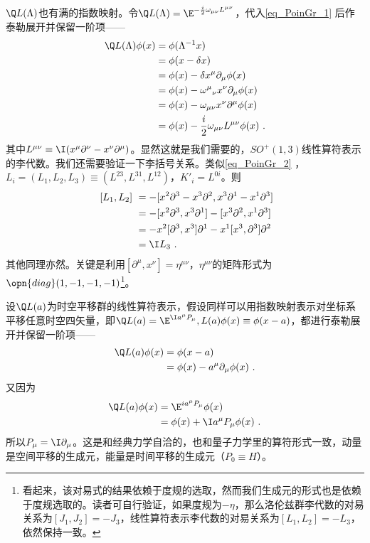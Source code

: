 $\Q L(\Lambda)$也有满的指数映射。令$\Q L(\Lambda)=\E^{-\frac{i}{2} \omega_{\mu \nu} L^{\mu \nu}}$，代入\autoref{eq_PoinGr_1} 后作泰勒展开并保留一阶项——
\begin{equation}
\begin{aligned}
\Q L(\Lambda)\phi(x)&=\phi(\Lambda^{-1}x)\\
&=\phi(x-\delta x)\\
&= \phi(x)-\delta x^{\mu} \partial_{\mu} \phi(x) \\
&= \phi(x)-\omega^{\mu}{ }_{\nu} x^{\nu} \partial_{\mu} \phi(x) \\
&=\phi(x)-\omega_{\mu \nu} x^{\nu} \partial^{\mu} \phi(x) \\
&= \phi(x)-\frac{i}{2} \omega_{\mu \nu} L^{\mu \nu} \phi(x)~.
\end{aligned}
\end{equation}
其中$L^{\mu\nu}\equiv\I(x^{\mu}\partial^{\nu}-x^{\nu}\partial^{\mu})$。显然这就是我们需要的，$SO^+(1,3)$线性算符表示的李代数。我们还需要验证一下李括号关系。类似\autoref{eq_PoinGr_2}  ，$L_i=(L_1,L_2,L_3)\equiv(L^{23},L^{31},L^{12})$，$K'_i=L^{0i}$。则
\begin{equation}
\begin{aligned}
~[L_1,L_2]~&=-[x^{2}\partial^{3}-x^{3}\partial^{2},x^{3}\partial^{1}-x^{1}\partial^{3}]\\
&=-[x^2\partial^3,x^3\partial^1]-[x^3\partial^2,x^1\partial^3]\\
&=-x^2[\partial^3,x^3]\partial^1-x^1[x^3,\partial^3]\partial^2\\
&=\I L_3~.
\end{aligned}
\end{equation}
其他同理亦然。关键是利用$[\partial^{\mu},x^{\nu}]=\eta^{\mu\nu}$，$\eta^{\mu\nu}$的矩阵形式为$\opn{diag}(1,-1,-1,-1)$\footnote{看起来，该对易式的结果依赖于度规的选取，然而我们生成元的形式也是依赖于度规选取的。读者可自行验证，如果度规为$-\eta$，那么洛伦兹群李代数的对易关系为$[J_1,J_2]=-J_3$，线性算符表示李代数的对易关系为$[L_1,L_2]=-L_3$，依然保持一致。}。

设$\Q L(a)$为时空平移群的线性算符表示，假设同样可以用指数映射表示对坐标系平移任意时空四矢量，即$\Q L(a)=\E^{\I a^{\mu}P_{\mu}},L(a)\phi(x)\equiv \phi(x-a)$，都进行泰勒展开并保留一阶项——
\begin{equation}\begin{aligned}
\Q L(a)\phi(x)& =\phi(x-a) \\
&=\phi(x)-a^{\mu}\partial_{\mu}\phi(x)~.
\end{aligned}\end{equation}
又因为
\begin{equation}
\begin{aligned}
\Q L(a)\phi(x)& = \E^{ia^{\mu}P_{\mu}}\phi(x) \\
&=\phi(x)+\I a^{\mu}P_{\mu}\phi(x)~.
\end{aligned}
\end{equation}
所以$P_{\mu}=\I\partial_{\mu}$。这是和经典力学自洽的，也和量子力学里的算符形式一致，动量是空间平移的生成元，能量是时间平移的生成元（$P_0\equiv H$）。

